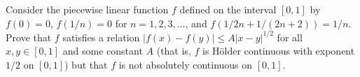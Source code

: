 Consider the piecewise linear function $f$ defined on the interval
$[0,1]$ by $f(0)=0$, $f(1/n)=0$ for $n=1,2,3,\ldots$, and
$f(1/2n+1/(2n+2))=1/n$. Prove that $f$ satisfies a relation
$|f(x)-f(y)|\leq A|x-y|^{1/2}$ for all $x,y\in [0,1]$ and some
constant $A$ (that is, $f$ is H\"older continuous with exponent $1/2$
on $[0,1]$) but that $f$ is not absolutely continuous on $[0,1]$.
